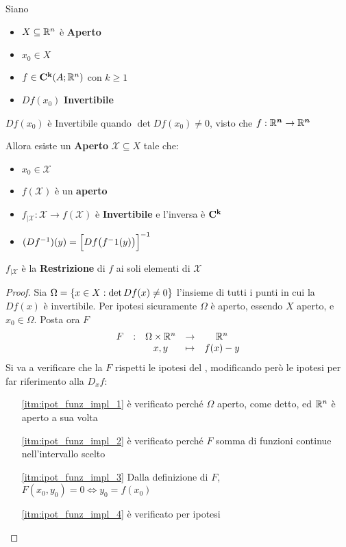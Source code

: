 \begin{theorem}
	\label{teo:funz_inv}
	Siano
	\begin{itemize}[noitemsep]
		\item $X \subseteq \mathbb{R}^n$ è \textbf{Aperto}
		\item $x_0 \in X$
		\item $f \in \mathbf{C^{k}}(A;\mathbb{R}^n)$ con $k \geq 1$
		\item $Df(x_0)$ \textbf{Invertibile}
	\end{itemize}
	\begin{note}
		$Df(x_0)$ è Invertibile quando $\det Df(x_0) \neq 0$, visto che $f: \mathbb{R}^{\boldsymbol{n}} \to \mathbb{R}^{\boldsymbol{n}}$
	\end{note}
	Allora esiste un \textbf{Aperto} $\mathcal{X} \subseteq X$ tale che:
	\begin{itemize}[noitemsep]
		\item $x_0 \in \mathcal{X}$
		\item $f(\mathcal{X})$ è un \textbf{aperto}
		\item $f_{|\mathcal{X}}: \mathcal{X} \to f(\mathcal{X})$ è \textbf{Invertibile} e l'inversa è $\mathbf{C^{k}}$
		\item $(Df^{-1})(y) = \Bigl[Df\bigl( f^-1(y) \bigr)\Bigr]^{-1}$
	\end{itemize}
	\begin{note}
		$f_{|\mathcal{X}}$ è la \textbf{Restrizione} di $f$ ai soli elementi di $\mathcal{X}$
	\end{note}
	\begin{proof}
		Sia $\Omega = \left\{x \in X: \det Df(x) \neq 0\right\}$ l'insieme di tutti i punti in cui la $Df(x)$ è invertibile. Per ipotesi sicuramente $\Omega$ è aperto, essendo $X$ aperto, e $x_0 \in \Omega$.
		Posta ora $F$
		\[\begin{array}{ccccc} {F} & : & {\Omega \times \mathbb{R}^n} & \to & {\mathbb{R}^n} \\ & & {x, y} & \mapsto & {f(x) - y} \\ \end{array}\]
		Si va a verificare che la $F$ rispetti le ipotesi del , modificando però le ipotesi per far riferimento alla $D_xf$:
		\begin{enumerate}[noitemsep]
			\item[\ref{itm:ipot_funz_impl_1}] è verificato perché $\Omega$ aperto, come detto, ed $\mathbb{R}^n$ è aperto a sua volta
			\item[\ref{itm:ipot_funz_impl_2}] è verificato perché $F$ somma di funzioni continue nell'intervallo scelto
			\item[\ref{itm:ipot_funz_impl_3}] Dalla definizione di $F$, $F(x_0, y_0) = 0 \iff y_0 = f(x_0)$
			\item[\ref{itm:ipot_funz_impl_4}] è verificato per ipotesi

\end{enumerate}
\end{proof}
\end{theorem}
